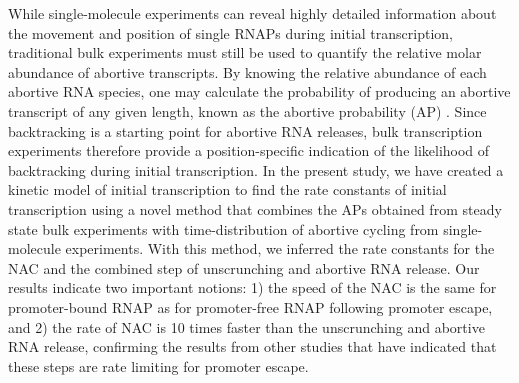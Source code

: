 While single-molecule experiments can reveal highly detailed information
about the movement and position of single RNAPs during initial transcription,
traditional bulk experiments must still be used to quantify the relative molar
abundance of abortive transcripts. By knowing the relative abundance of each
abortive RNA species, one may calculate the probability of producing an
abortive transcript of any given length, known as the abortive probability
(AP) \cite{hsu_promoter_2002, hsu_quantitative_1996}. Since backtracking is a
starting point for abortive RNA releases, bulk transcription experiments
therefore provide a position-specific indication of the likelihood of
backtracking during initial transcription. In the present study, we have
created a kinetic model of initial transcription to find the rate constants of
initial transcription using a novel method that combines the APs obtained from
steady state bulk experiments with time-distribution of abortive cycling from
single-molecule experiments. With this method, we inferred the rate constants
for the NAC and the combined step of unscrunching and abortive RNA release.
Our results indicate two important notions: 1) the speed of the NAC is the
same for promoter-bound RNAP as for promoter-free RNAP following promoter
escape, and 2) the rate of NAC is 10 times faster than the unscrunching and
abortive RNA release, confirming the results from other studies that have
indicated that these steps are rate limiting for promoter escape.
